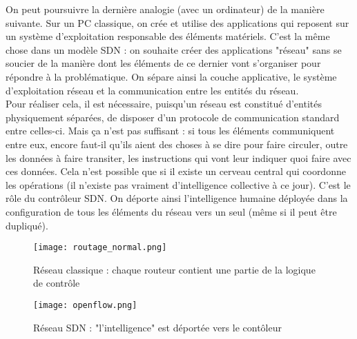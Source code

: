 On peut poursuivre la dernière analogie (avec un ordinateur) de la manière suivante. Sur un PC classique, on crée et utilise des applications qui reposent sur un système d'exploitation responsable des éléments matériels. C'est la même chose dans un modèle SDN : on souhaite créer des applications "réseau" sans se soucier de la manière dont les éléments de ce dernier vont s'organiser pour répondre à la problématique. On sépare ainsi la couche applicative, le système d'exploitation réseau et la communication entre les entités du réseau.\\

Pour réaliser cela, il est nécessaire, puisqu'un réseau est constitué d'entités physiquement séparées, de disposer d'un protocole de communication standard entre celles-ci. Mais ça n'est pas suffisant : si tous les éléments communiquent entre eux, encore faut-il qu'ils aient des choses à se dire pour faire circuler, outre les données à faire transiter, les instructions qui vont leur indiquer quoi faire avec ces données. Cela n'est possible que si il existe un cerveau central qui coordonne les opérations (il n'existe pas vraiment d'intelligence collective à ce jour). C'est le rôle du contrôleur SDN. On déporte ainsi l'intelligence humaine déployée dans la configuration de tous les éléments du réseau vers un seul (même si il peut être dupliqué).\\



\begin{figure}[h]
  	\centering
  	\texttt{[image: routage\_normal.png]}
  	\caption{Réseau classique : chaque routeur contient une partie de la logique de contrôle}
\end{figure}

\begin{figure}[h]
  	\centering
  	\texttt{[image: openflow.png]}
  	\caption[Caption for LOF]{Réseau SDN : "l'intelligence" est déportée vers le contôleur \footnotemark}
\end{figure}


